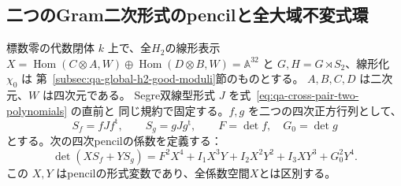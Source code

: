 
\subsection{二つのGram二次形式のpencilと全大域不変式環}
\label{subsec:qa-global-h2-invariant-hull}

標数零の代数閉体 $k$ 上で、全$H_2$の線形表示
$X=\operatorname{Hom}(C\otimes A,W)\oplus
\operatorname{Hom}(D\otimes B,W)=\mathbb A^{32}$
と $G,H=G\rtimes S_2$、線形化 $\chi_0$ は
第~\ref{subsec:qa-global-h2-good-moduli}節のものとする。
$A,B,C,D$ は二次元、$W$ は四次元である。
Segre双線型形式 $J$ を式~\eqref{eq:qa-cross-pair-two-polynomials} の直前と
同じ規約で固定する。$f,g$ を二つの四次正方行列として、
\[
 S_f=fJf^{\mathrm t},\qquad S_g=gJg^{\mathrm t},\qquad
 F=\det f,\quad G_0=\det g
\]
とする。次の四次pencilの係数を定義する：
\[
 \det(XS_f+YS_g)
 =F^2X^4+I_1X^3Y+I_2X^2Y^2+I_3XY^3+G_0^2Y^4.
 \tag{GP}\label{eq:qa-global-gram-pencil}
\]
この $X,Y$ はpencilの形式変数であり、全係数空間$X$とは区別する。

